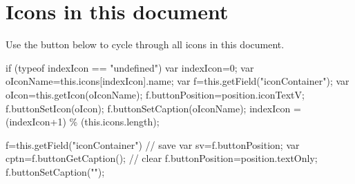 \documentclass{article}
\begin{document}
\vcgBdry[6pt]

\newpage

\section{Icons in this document}

Use the button below to cycle through all icons in this document.

\begin{defineJS}{\cycleJS}
if (typeof indexIcon == "undefined") var indexIcon=0;
var oIconName=this.icons[indexIcon].name;
var f=this.getField("iconContainer");
var oIcon=this.getIcon(oIconName);
f.buttonPosition=position.iconTextV;
f.buttonSetIcon(oIcon);
f.buttonSetCaption(oIconName);
indexIcon = (indexIcon+1) \% (this.icons.length);
\end{defineJS}
\begin{defineJS}{\clearJS}
f=this.getField("iconContainer")
// save
var sv=f.buttonPosition;
var cptn=f.buttonGetCaption();
// clear
f.buttonPosition=position.textOnly;
f.buttonSetCaption("");
\end{defineJS}

\begin{center}
\vcgBdry[6bp]
\cgBdry[3bp]
\end{center}
\end{document}
